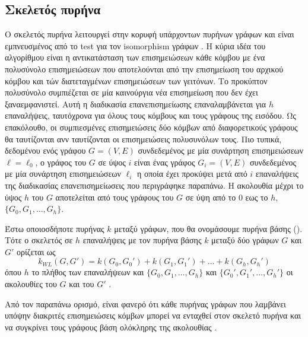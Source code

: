 \subsection{Σκελετός πυρήνα }
Ο σκελετός πυρήνα  λειτουργεί στην κορυφή υπάρχοντων πυρήνων γράφων και είναι εμπνευσμένος από το test  για τον isomorphism γράφων \cite{weisfeiler1968reduction}.
Η κύρια ιδέα του αλγορίθμου  είναι η αντικατάσταση των επισημειώσεων κάθε κόμβου με ένα πολυσύνολο επισημειώσεων που αποτελούνται από την επισημείωση του αρχικού κόμβου και τών διατεταγμένων επισημειώσεων των γειτόνων.
Το προκύπτον πολυσύνολο συμπιέζεται σε μία καινούργια νέα επισημείωση που δεν έχει ξαναεμφανιστεί.
Αυτή η διαδικασία επανεπισημείωσης επαναλαμβάνεται για $h$ επαναλήψεις, ταυτόχρονα για όλους τους κόμβους και τους γράφους της εισόδου.
Ως επακόλουθο, οι συμπιεσμένες επισημειώσεις δύο κόμβων από διαφορετικούς γράφους θα ταυτίζονται ανν ταυτίζονται οι επισημειώσεις πολυσυνόλων τους.
Πιο τυπικά, δεδομένου ενός γράφου $G=(V,E)$ συνδεδεμένος με μία συνάρτηση επισημειώσεων $\ell=\ell_0$, ο γράφος  του $G$ σε ύψος $i$ είναι ένας γράφος $G_i=(V,E)$ συνδεδεμένος με μία συνάρτηση επισημειώσεων $\ell_i$ η οποία έχει προκύψει μετά από $i$ επαναλήψεις της διαδικασίας επανεπισημείωσεις που περιγράφηκε παραπάνω.
Η ακολουθία  μέχρι το ύψος $h$ του $G$ αποτελείται από τους γράφους  του $G$ σε ύψη από το $0$ εως το $h$, $\{ G_0,G_1,\ldots,G_h\}$. 
\begin{definition}
	Έστω οποιοσδήποτε πυρήνας $k$ μεταξύ γράφων, που θα ονομάσουμε πυρήνα βάσης ().
	Τότε ο σκελετός  σε $h$ επαναλήψεις με τον πυρήνα βάσης $k$ μεταξύ δύο γράφων $G$ και $G'$ ορίζεται ως
	\begin{equation}
		k_{WL}(G,G') = k(G_0,G_0') + k(G_1,G_1') + \ldots + k(G_h,G_h')
	\end{equation}
	όπου $h$ το πλήθος των επαναλήψεων  και $\{ G_0,G_1,\ldots,G_h\}$ και $\{ G_0',G_1',\ldots,G_h'\}$ οι ακολουθίες  του $G$ και του $G'$ .
\end{definition}
Από τον παραπάνω ορισμό, είναι φανερό ότι κάθε πυρήνας γράφων που λαμβάνει υπόψην διακριτές επισημειώσεις κόμβων μπορεί να ενταχθεί στον σκελετό πυρήνα  και να συγκρίνει τους γράφους βάση ολόκληρης της ακολουθίας .

